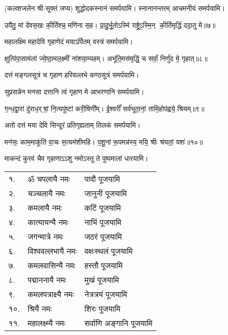 \begin{center}
(कलशजलेन श्री-सूक्तं जप्य) शुद्धोदकस्नानं समर्पयामि।
स्नानानन्तरम् आचमनीयं समर्पयामि।\medskip

उपै॑तु॒ मां दे॑वस॒खः की॒र्तिश्च॒ मणि॑ना स॒ह।
प्रा॒दु॒र्भू॒तोऽस्मि॑ राष्ट्रे॒ऽ॒स्मि॒न् की॒र्तिमृद्धिं॑ ददा॒तु मे॥७॥


{महालक्ष्मि महादेवि गृहाणेदं मयाऽर्पितम्}
 वस्त्रं समर्पयामि।\medskip

 क्षुत्पि॑पा॒साम॑लां ज्ये॒ष्ठा॒मल॒क्ष्मीं ना॑शया॒म्यहम्।
अभू॑ति॒\-मस॑मृद्धिं॒ च सर्वां॒ निर्णु॑द मे॒ गृहात्॥८॥


{दत्तं मङ्गलसूत्रं च गृहाण हरिवल्लभे}
कण्ठसूत्रं समर्पयामि।\medskip


{सुप्रसन्नेन मनसा दत्तानि त्वं गृहाण मे}
आभरणानि समर्पयामि।\medskip


ग॒न्ध॒द्वा॒रां दु॑राध॒र्‌षां॒ नि॒त्यपु॑ष्टां करी॒षिणी᳚म्।
ई॒श्वरीं᳚ सर्व॑भूता॒नां॒ तामि॒होप॑ह्वये॒ श्रियम्॥९॥

{अतो दत्तं मया देवि सिन्दूरं प्रतिगृह्यताम्}
 तिलकं समर्पयामि। \medskip


मन॑सः॒ काम॒माकू॑तिं वा॒चः स॒त्यम॑शीमहि।
प॒शू॒नां रू॒पमन्न॑स्य॒ मयि॒ श्रीः श्र॑यतां॒ यशः॑॥१०॥

{माकन्दं कुरवं चैव गृहाणाऽऽशु नमोऽस्तु ते}
  पुष्पमालां धारयामि। 
\end{center}
\begin{longtable}{ll@{— }l}
१.& ॐ चपलायै नमः & पादौ पूजयामि \\
२.& चञ्चलायै नमः & जानुनी पूजयामि\\
३.& कमलायै नमः & कटिं पूजयामि  \\
४.& कात्यायन्यै नमः & नाभिं पूजयामि\\
५.& जगन्मात्रे नमः & जठरं पूजयामि   \\
६.& विश्ववल्लभायै नमः & वक्षःस्थलं पूजयामि \\
७.& कमलवासिन्यै नमः & हस्तौ पूजयामि        \\
८.& पद्माननायै नमः & मुखं पूजयामि\\
९.& कमलपत्राक्ष्यै नमः & नेत्रत्रयं पूजयामि    \\
१०.& श्रियै नमः & शिरः पुजयामि\\
११.& महालक्ष्म्यै नमः & सर्वाणि अङ्गानि पूजयामि   \\
\end{longtable}

